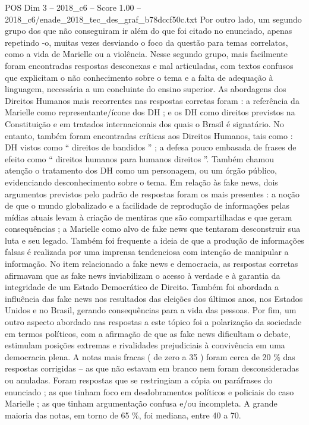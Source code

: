 \begin{textsample}{POS Dim 3 – 2018\_c6 – Score 1.00 – 2018\_c6/enade\_2018\_tec\_des\_graf\_b78dccf50c.txt}
Por outro lado, um segundo grupo dos que não conseguiram ir além do que foi citado no enunciado, apenas repetindo -o, muitas vezes desviando o foco da questão para temas correlatos, como a vida de Marielle ou a violência.
Nesse segundo grupo, mais facilmente foram encontradas respostas desconexas e mal articuladas, com textos confusos que explicitam o não conhecimento sobre o tema e a falta de adequação à linguagem, necessária a um concluinte do ensino superior.
As abordagens dos Direitos Humanos mais recorrentes nas respostas corretas foram : a referência da Marielle como representante/ícone dos DH ; e os DH como direitos previstos na Constituição e em tratados internacionais dos quais o Brasil é signatário.
No entanto, também foram encontradas críticas aos Direitos Humanos, tais como : DH vistos como “ direitos de bandidos ” ; a defesa pouco embasada de frases de efeito como “ direitos humanos para humanos direitos ”.
Também chamou atenção o tratamento dos DH como um personagem, ou um órgão público, evidenciando desconhecimento sobre o tema.
Em relação às fake news, dois argumentos previstos pelo padrão de respostas foram os mais presentes : a noção de que o mundo globalizado e a facilidade de reprodução de informações pelas mídias atuais levam à criação de mentiras que são compartilhadas e que geram consequências ; a Marielle como alvo de fake news que tentaram desconstruir sua luta e seu legado.
Também foi frequente a ideia de que a produção de informações falsas é realizada por uma imprensa tendenciosa com intenção de manipular a informação.
No item relacionado a fake news e democracia, as respostas corretas afirmavam que as fake news inviabilizam o acesso à verdade e à garantia da integridade de um Estado Democrático de Direito.
Também foi abordada a influência das fake news nos resultados das eleições dos últimos anos, nos Estados Unidos e no Brasil, gerando consequências para a vida das pessoas.
Por fim, um outro aspecto abordado nas respostas a este tópico foi a polarização da sociedade em termos políticos, com a afirmação de que as fake news dificultam o debate, estimulam posições extremas e rivalidades prejudiciais à convivência em uma democracia plena.
A notas mais fracas ( de zero a 35 ) foram cerca de 20 \% das respostas corrigidas – as que não estavam em branco nem foram desconsideradas ou anuladas.
Foram respostas que se restringiam a cópia ou paráfrases do enunciado ; as que tinham foco em desdobramentos políticos e policiais do caso Marielle ; as que tinham argumentação confusa e/ou incompleta.
A grande maioria das notas, em torno de 65 \%, foi mediana, entre 40 a 70.

\end{textsample}
